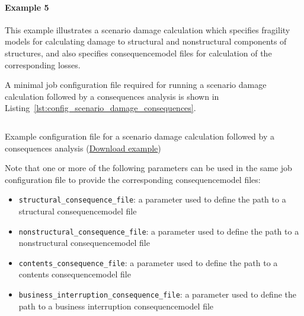 \paragraph{Example 5}

This example illustrates a scenario damage calculation which specifies
fragility models for calculating damage to structural and nonstructural
components of structures, and also specifies \gls{consequencemodel} files for
calculation of the corresponding losses.

A minimal job configuration file required for running a scenario damage
calculation followed by a consequences analysis is shown in
Listing~\ref{lst:config_scenario_damage_consequences}.

\begin{listing}[htbp]
  \inputminted[firstline=1,firstnumber=1,fontsize=\footnotesize,frame=single,linenos,bgcolor=lightgray,label=job.ini]{ini}{oqum/risk/verbatim/config_scenario_damage_consequences.ini}
  \caption{Example configuration file for a scenario damage calculation followed by a consequences analysis (\href{https://raw.githubusercontent.com/GEMScienceTools/oq-engine-docs/master/oqum/risk/verbatim/config_scenario_damage_consequences.ini}{Download example})}
  \label{lst:config_scenario_damage_consequences}
\end{listing}

Note that one or more of the following parameters can be used in the same job
configuration file to provide the corresponding \gls{consequencemodel} files:

\begin{itemize}

  \item \Verb+structural_consequence_file+: a parameter used to define the path
    to a structural \gls{consequencemodel} file

  \item \Verb+nonstructural_consequence_file+: a parameter used to define the path
    to a nonstructural \gls{consequencemodel} file

  \item \Verb+contents_consequence_file+: a parameter used to define the path
    to a contents \gls{consequencemodel} file

  \item \Verb+business_interruption_consequence_file+: a parameter used to define
    the path to a business interruption \gls{consequencemodel} file

\end{itemize}

